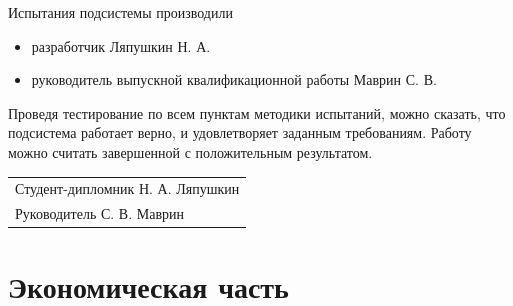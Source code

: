 \documentclass[a4paper]{extarticle}
\numberwithin{equation}{section}
\begin{document}
Испытания подсистемы производили
\begin{itemize}
\item разработчик Ляпушкин Н. А.
\item руководитель выпускной квалификационной работы Маврин С. В.
\end{itemize}\par
Проведя тестирование по всем пунктам методики испытаний, можно сказать, что подсистема работает верно, и удовлетворяет заданным требованиям. Работу можно считать завершенной с положительным результатом.
\vfill
\begin{flushright}
\begin{tabular}{p{}}
  Студент-дипломник \hrulefill Н. А. Ляпушкин \\
  Руководитель \hrulefill С. В. Маврин
\end{tabular}
\end{flushright}

\newpage
\section{Экономическая часть}
\end{document}
